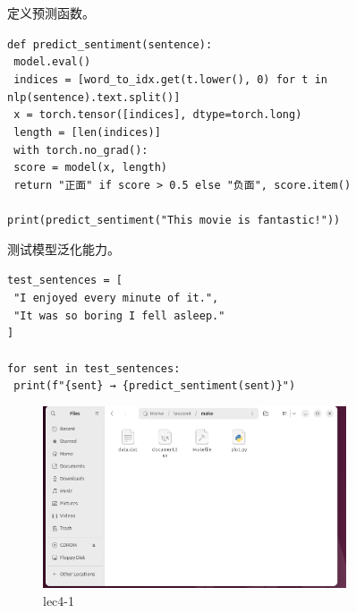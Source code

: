 \documentclass[a4paper, 12pt]{article}
\begin{document}
\begin{tcolorbox}[instancestyle, title=实例19：模型预测新句子]
定义预测函数。

\texttt{def predict\_sentiment(sentence):} \\
\texttt{    model.eval()} \\
\texttt{    indices = [word\_to\_idx.get(t.lower(), 0) for t in nlp(sentence).text.split()]} \\
\texttt{    x = torch.tensor([indices], dtype=torch.long)} \\
\texttt{    length = [len(indices)]} \\
\texttt{    with torch.no_grad():} \\
\texttt{        score = model(x, length)} \\
\texttt{    return "正面" if score > 0.5 else "负面", score.item()} \\
\texttt{} \\
\texttt{print(predict\_sentiment("This movie is fantastic!"))}
\end{tcolorbox}

\begin{tcolorbox}[instancestyle, title=实例20：独立测试集验证]
测试模型泛化能力。

\texttt{test\_sentences = [} \\
\texttt{    "I enjoyed every minute of it.",} \\
\texttt{    "It was so boring I fell asleep."} \\
\texttt{]} \\
\texttt{} \\
\texttt{for sent in test\_sentences:} \\
\texttt{    print(f"\{sent\} → \{predict\_sentiment(sent)\}")}
\end{tcolorbox}



\begin{figure}[htbp]
    \centering
    \includegraphics[width=0.8\textwidth]{lec4 (1).png}
    \caption{lec4-1}
\end{figure}
\end{document}
